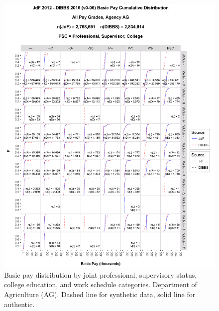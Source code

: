 \documentclass[10pt, letterpaper]{article}
\begin{document}
\begin{spacing}{1.0}
\begin{figure}[h]
    \centering
    \includegraphics[width=6.5in, trim={0 0 1in 1.5in}, clip]{JdFDIBBSBasicPayCDFAG.png}
    \caption{Basic pay distribution by joint professional, supervisory status, college education, and work schedule  categories.  Department of Agriculture (AG).  Dashed line for synthetic data, solid line for authentic.}
    \label{figure:JdFDIBBSBasicPayCDFAG}
\end{figure}

\clearpage


\end{spacing}
\end{document}
